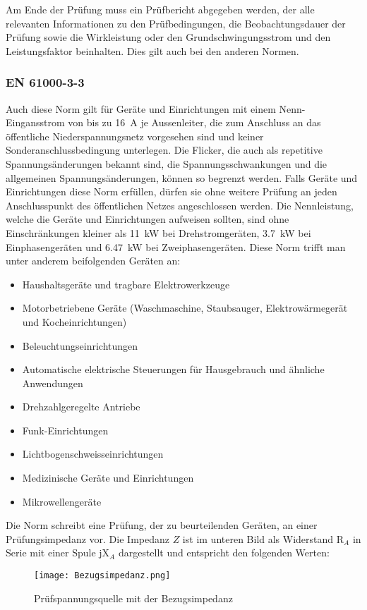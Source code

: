 Am Ende der Prüfung muss ein Prüfbericht abgegeben werden, der alle relevanten Informationen zu den Prüfbedingungen, die Beobachtungsdauer der Prüfung sowie die Wirkleistung oder den Grundschwingungsstrom und den Leistungsfaktor beinhalten. Dies gilt auch bei den anderen Normen.

\subsubsection{EN 61000-3-3}
Auch diese Norm gilt für Geräte und Einrichtungen mit einem Nenn-Eingansstrom von bis zu \SI{16}{A} je Aussenleiter, die zum Anschluss an das öffentliche Niederspannungsnetz vorgesehen sind und keiner Sonderanschlussbedingung unterlegen. Die Flicker, die auch als repetitive Spannungsänderungen bekannt sind, die Spannungsschwankungen und die allgemeinen Spannungsänderungen, können so begrenzt werden. Falls Geräte und Einrichtungen diese Norm erfüllen, dürfen sie ohne weitere Prüfung an jeden Anschlusspunkt des öffentlichen Netzes angeschlossen werden. Die Nennleistung, welche die Geräte und Einrichtungen aufweisen sollten, sind ohne Einschränkungen kleiner als \SI{11}{kW} bei Drehstromgeräten, \SI{3.7}{kW} bei Einphasengeräten und \SI{6.47}{kW} bei Zweiphasengeräten. Diese Norm trifft man unter anderem beifolgenden Geräten an:
\begin{itemize}
\item Haushaltsgeräte und tragbare Elektrowerkzeuge 
\item Motorbetriebene Geräte (Waschmaschine, Staubsauger, Elektrowärmegerät und Kocheinrichtungen)
\item Beleuchtungseinrichtungen
\item Automatische elektrische Steuerungen für Hausgebrauch und ähnliche Anwendungen
\item Drehzahlgeregelte Antriebe
\item Funk-Einrichtungen
\item Lichtbogenschweisseinrichtungen
\item Medizinische Geräte und Einrichtungen
\item Mikrowellengeräte	
\end{itemize}

Die Norm schreibt eine Prüfung, der zu beurteilenden Geräten, an einer Prüfungsimpedanz vor. Die Impedanz $Z$ ist im unteren Bild als Widerstand R$_A$ in Serie mit einer Spule jX$_A$ dargestellt und entspricht den folgenden Werten:


\begin{figure}[ht!]
	\centering
	\texttt{[image: Bezugsimpedanz.png]}	
	\caption{Prüfspannungsquelle mit der Bezugsimpedanz}
	\label{fig:Bezugsimpedanz}
\end{figure}

